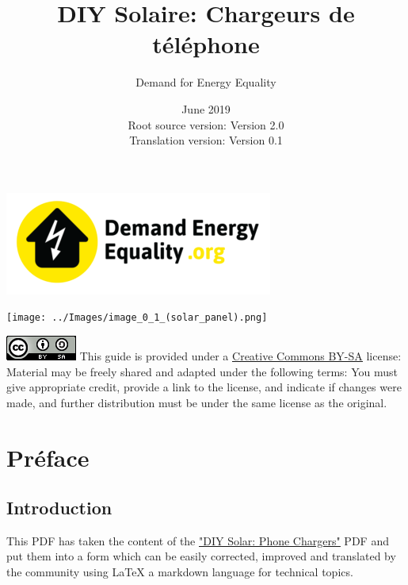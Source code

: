 \documentclass{article}
\title{DIY Solaire: Chargeurs de téléphone}
\author{Demand for Energy Equality}
\date{June 2019 \\ Root source version: Version 2.0 \\ Translation version: Version 0.1}
\theoremstyle{definition}
\theoremstyle{definition}
\theoremstyle{remark}
\begin{document}
 
\maketitle{}

\begin{center}
  \includegraphics[width=0.25\paperwidth]{../Images/image_0_0_(demand_energy_equality).png}
\end{center}

\begin{center}
  \texttt{[image: ../Images/image\_0\_1\_(solar\_panel).png]}
\end{center}

\vfill
  
\includegraphics[]{../Images/image_0_2_(license).png} \newline
This guide is provided under a \href{https://creativecommons.org/licenses/by-sa/4.0/legalcode}{\underline{Creative Commons BY-SA}} license: \newline
Material may be freely shared and adapted under the following terms: You must give appropriate credit, provide a link to the license, and indicate if changes were made, and further distribution must be under the same license as the original.

\newpage

\tableofcontents

\newpage

{\color{blue}\section{Préface}} %
\label{sec:preface}

  {\color{blue}\subsection*{Introduction}} %
  \label{sub:introduction}
  
    This PDF has taken the content of the \href{https://www.demandenergyequality.org/build-your-own-panels}{\underline{"DIY Solar: Phone Chargers"}} PDF and put them into a form which can be easily corrected, improved and translated by the community using LaTeX a markdown language for technical topics.
\end{document}
